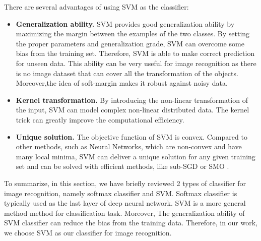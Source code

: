 There are several advantages of using SVM as the classifier: 
\begin{itemize}
	\item \textbf{Generalization ability.} SVM provides good generalization ability by maximizing the margin between the examples of the two classes. By setting the proper parameters and generalization grade, SVM can overcome some bias from the training set. Therefore, SVM is able to make correct prediction for unseen data. This ability can be very useful for image recognition as there is no image dataset that can cover all the transformation of the objects. Moreover,the idea of soft-margin makes it robust against noisy data.
	\item \textbf{Kernel transformation.} By introducing the non-linear transformation of the input, SVM can model complex non-linear distributed data. The kernel trick can greatly improve the computational efficiency.   
	\item \textbf{Unique solution.} The objective function of SVM is  convex. Compared to other methods, such as Neural Networks, which are non-convex and have many local minima, SVM can deliver a unique solution for any given training set and can be solved with efficient methods, like sub-SGD \cite{shalev2011pegasos} or SMO \cite{platt1998sequential}. 
\end{itemize}

To summarize, in this section, we have briefly reviewed 2 types of classifier for image recognition, namely softmax classifier and SVM. Softmax classifier is typically used as the last layer of deep neural network. SVM is a more general method method for classification task. Moreover, The generalization ability of SVM classifier can reduce the bias from the training data. Therefore, in our work, we choose SVM as our classifier for image recognition.
